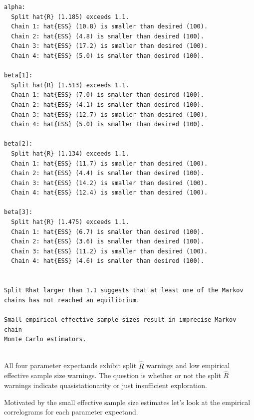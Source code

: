 \documentclass[
  letterpaper,
  DIV=11,
  numbers=noendperiod]{scrartcl}
\begin{document}
\begin{verbatim}
alpha:
  Split hat{R} (1.185) exceeds 1.1.
  Chain 1: hat{ESS} (10.8) is smaller than desired (100).
  Chain 2: hat{ESS} (4.8) is smaller than desired (100).
  Chain 3: hat{ESS} (17.2) is smaller than desired (100).
  Chain 4: hat{ESS} (5.0) is smaller than desired (100).

beta[1]:
  Split hat{R} (1.513) exceeds 1.1.
  Chain 1: hat{ESS} (7.0) is smaller than desired (100).
  Chain 2: hat{ESS} (4.1) is smaller than desired (100).
  Chain 3: hat{ESS} (12.7) is smaller than desired (100).
  Chain 4: hat{ESS} (5.0) is smaller than desired (100).

beta[2]:
  Split hat{R} (1.134) exceeds 1.1.
  Chain 1: hat{ESS} (11.7) is smaller than desired (100).
  Chain 2: hat{ESS} (4.4) is smaller than desired (100).
  Chain 3: hat{ESS} (14.2) is smaller than desired (100).
  Chain 4: hat{ESS} (12.4) is smaller than desired (100).

beta[3]:
  Split hat{R} (1.475) exceeds 1.1.
  Chain 1: hat{ESS} (6.7) is smaller than desired (100).
  Chain 2: hat{ESS} (3.6) is smaller than desired (100).
  Chain 3: hat{ESS} (11.2) is smaller than desired (100).
  Chain 4: hat{ESS} (4.6) is smaller than desired (100).


Split Rhat larger than 1.1 suggests that at least one of the Markov
chains has not reached an equilibrium.
 
Small empirical effective sample sizes result in imprecise Markov chain
Monte Carlo estimators.
 
\end{verbatim}

All four parameter expectands exhibit split \(\hat{R}\) warnings and low
empirical effective sample size warnings. The question is whether or not
the split \(\hat{R}\) warnings indicate quasistationarity or just
insufficient exploration.

Motivated by the small effective sample size estimates let's look at the
empirical correlograms for each parameter expectand.
\end{document}

